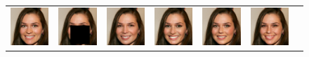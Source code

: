 \begin{figure}
\begin{center}
\begin{tabular}{ccccccc}
        \includegraphics[width=.145\textwidth]{Chapter2/samples/extended_results/inpainting/47/x.png} &   
        \includegraphics[width=.145\textwidth]{Chapter2/samples/extended_results/inpainting/47/y.png} &
        \includegraphics[width=.145\textwidth]{Chapter2/samples/extended_results/inpainting/47/CDE.png} & 
        \includegraphics[width=.145\textwidth]{Chapter2/samples/extended_results/inpainting/47/CDiffE.png} &
        \includegraphics[width=.145\textwidth]{Chapter2/samples/extended_results/inpainting/47/cmde.png} &
        \includegraphics[width=.145\textwidth]{Chapter2/samples/extended_results/inpainting/47/VS-CMDE.png}\\
        

\end{tabular}
\end{center}
\end{figure}
